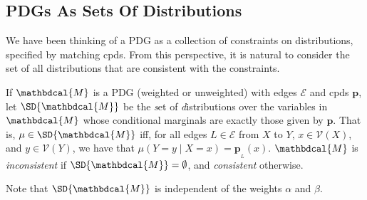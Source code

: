 \documentclass[letterpaper]{article} %
\theoremstyle{plain}
\theoremstyle{definition}
\theoremstyle{remark}
\newtheorem*{remark}{Remark}
\newcommand{\notation}[1]{{\color{notationcolor} #1}}
\renewcommand{\notation}[1]{\ignorespaces} %
\newcommand\mat[1]{\mathbf{#1}}
\newcommand{\none}{\bullet}
\def\sheq{\!=\!}
\newcommand{\bp}[1][L]{\mat{p}_{\!_{#1}\!}}
\newcommand{\V}{\mathcal V}
\newcommand{\N}{\mathcal N}
\newcommand{\Ed}{\mathcal E}
\newcommand{\pdgvars}[1][]{(\N#1, \Ed#1, \V#1, \mat p#1, \beta#1)}
\newcommand{\dg}[1]{\mathbdcal{#1}}
\begin{document}
\subsection{PDGs As Sets Of Distributions}\label{sec:set-of-distribution-semantics} 
We have been thinking of a PDG as a collection of constraints on distributions,
specified by matching cpds. From this perspective, it is natural to consider the
set of all distributions that are consistent with the constraints.

\begin{defn} \label{def:set-semantics} 
If $\dg M$ is a PDG (weighted or unweighted) with edges $\Ed$ and
cpds $\mat p$, 
let $\SD{\dg M}$ be the \emph{s}et of
\emph{d}istributions over the variables in $\dg M$ 
whose conditional marginals are exactly those given by $\mat p$.
That is, $\mu \in \SD{\dg M}$ iff, for all edges $L \in \Ed$ from $X$
to $Y$,  $x \in 
\V(X)$,  and $y \in \V(Y)$, we have that $\mu(Y \!=\! y \mid X\sheq x) = \bp(x)$.
\notation{Formally,		
    \[ \SD[\Big]{\dg M} = \!\left\{\mu \!\in\! \Delta \V_\none (\dg M) \middle|\!
        \begin{array}{l}
        \mu(B\!\! =\!\! b \mid A\!\!=\!\! a) \geq \bp(b \mid a) \\[0.1em]
        ~\text{$\forall (A, B,\ell) \!\in\! \Ed$, $a \!\in\!\V(A)$, $b \!\in\! \V(B)$} 
   		\end{array}\!\!\! \right\}\]
    }
$\dg M$ is \emph{inconsistent} if $\SD{\dg M} = \emptyset$, and \emph{consistent} otherwise.
\end{defn}
%	
Note that $\SD{\dg M}$ is independent of the weights $\alpha$ and $\beta$.
\end{document}
